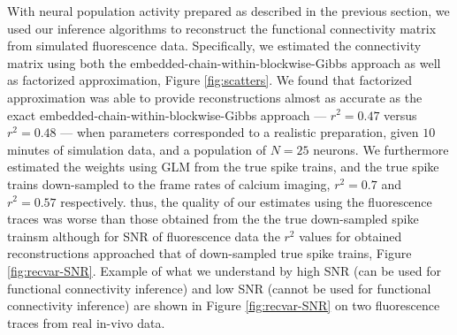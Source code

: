 With neural population activity prepared as described in the previous section, we used our inference algorithms to reconstruct the functional connectivity matrix from simulated fluorescence data. Specifically, we estimated the connectivity matrix using both
the embedded-chain-within-blockwise-Gibbs approach as well as factorized approximation, Figure \ref{fig:scatters}.  We found that factorized approximation was able to provide reconstructions almost as accurate as the exact embedded-chain-within-blockwise-Gibbs approach --- $r^2=0.47$ versus $r^2=0.48$ --- when parameters corresponded to a realistic preparation, given $10$ minutes of simulation data, and a population of $N=25$ neurons.
We furthermore estimated the weights using GLM from the true spike trains, and the
true spike trains down-sampled to the frame rates  of calcium imaging,
$r^2=0.7$ and $r^2=0.57$ respectively.
thus, the quality of our estimates using the fluorescence traces was worse than those obtained from the the true down-sampled spike trainsm
although for SNR of fluorescence data the $r^2$ values for obtained reconstructions approached that of down-sampled true spike trains, Figure \ref{fig:recvar-SNR}.
Example of what we understand by high SNR (can be used for functional connectivity
inference) and low SNR (cannot be used for functional connectivity inference)
are shown in Figure \ref{fig:recvar-SNR} on two fluorescence traces from real
in-vivo data.




